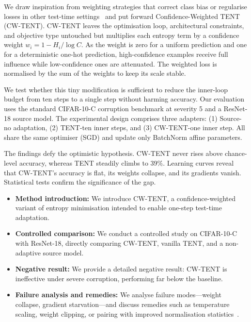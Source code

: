 \documentclass{article} %
\begin{document}
We draw inspiration from weighting strategies that correct class bias or regularise losses in other test-time settings~\cite{author-year-test,zhao-2023-delta} and put forward Confidence-Weighted TENT (CW-TENT). CW-TENT leaves the optimisation loop, architectural constraints, and objective type untouched but multiplies each entropy term by a confidence weight \(w_{i} = 1 - H_{i}/\log C\). As the weight is zero for a uniform prediction and one for a deterministic one-hot prediction, high-confidence examples receive full influence while low-confidence ones are attenuated. The weighted loss is normalised by the sum of the weights to keep its scale stable.

We test whether this tiny modification is sufficient to reduce the inner-loop budget from ten steps to a single step without harming accuracy. Our evaluation uses the standard CIFAR-10-C corruption benchmark at severity 5 and a ResNet-18 source model. The experimental design comprises three adapters: (1) Source-no adaptation, (2) TENT-ten inner steps, and (3) CW-TENT-one inner step. All share the same optimiser (SGD) and update only BatchNorm affine parameters.

The findings defy the optimistic hypothesis. CW-TENT never rises above chance-level accuracy, whereas TENT steadily climbs to 39\%. Learning curves reveal that CW-TENT's accuracy is flat, its weights collapse, and its gradients vanish. Statistical tests confirm the significance of the gap.

\begin{itemize}
  \item \textbf{Method introduction:} We introduce CW-TENT, a confidence-weighted variant of entropy minimisation intended to enable one-step test-time adaptation.
  \item \textbf{Controlled comparison:} We conduct a controlled study on CIFAR-10-C with ResNet-18, directly comparing CW-TENT, vanilla TENT, and a non-adaptive source model.
  \item \textbf{Negative result:} We provide a detailed negative result: CW-TENT is ineffective under severe corruption, performing far below the baseline.
  \item \textbf{Failure analysis and remedies:} We analyse failure modes---weight collapse, gradient starvation---and discuss remedies such as temperature scaling, weight clipping, or pairing with improved normalisation statistics~\cite{zhao-2023-delta}.
\end{itemize}
\end{document}
